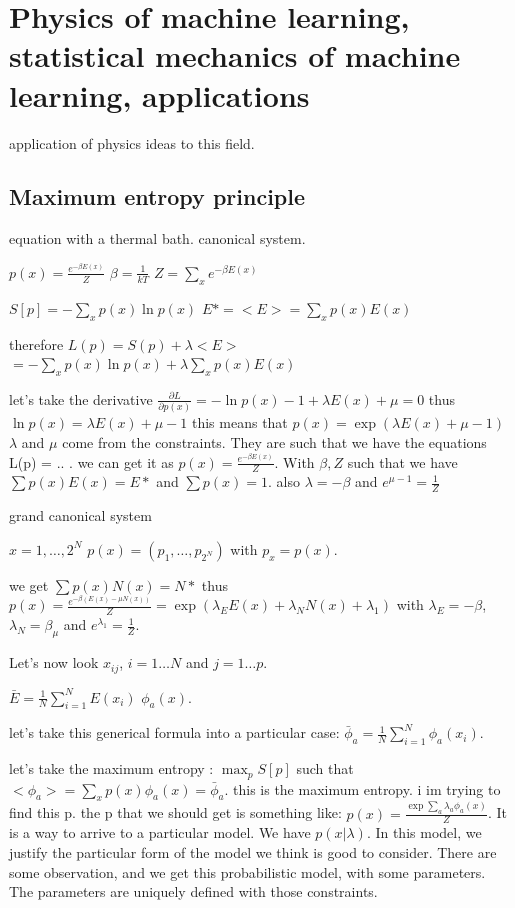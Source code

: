 \documentclass[a4paper]{tufte-book}
\newcommand{\nth}{\frac{1}{N}}
\newcommand{\sumin}{\sum_{i=1}^N}
\begin{document}
\chapter{Physics of machine learning, statistical mechanics of machine learning, applications}
\label{ch:physics}

application of physics ideas to this field.

\section{Maximum entropy principle}

equation with a thermal bath.
canonical system.


$p(x) = \frac{e^{-\beta E(x)}}{Z}$ $\beta = \frac{1}{kT}$
$Z = \sum_x e^{-\beta E(x)}$

$S[p] = - \sum_x p(x) \ln p(x)$
$E* = <E> = \sum_x p(x) E(x)$

therefore $L(p) = S(p) + \lambda <E>$
$ = - \sum_x p(x) \ln p(x) + \lambda \sum_x p(x) E(x)$

let's take the derivative
$\frac{\partial L}{\partial p(x)} = -\ln p(x) - 1 + \lambda E(x) + \mu = 0$
thus $\ln p(x) = \lambda E(x) + \mu - 1$
this means that $p(x) = \exp (\lambda E(x) + \mu - 1)$
$\lambda$ and $\mu$ come from the constraints. They are such that we have the equations L(p) = .. . 
we can get it as
$p(x) = \frac{e^{-\beta E(x)}}{Z}$. With $\beta,Z$ such that we have 
$\sum p(x) E(x) = E*$ and $ \sum p(x) = 1$.
also $\lambda = - \beta$ and $e^{\mu - 1} = \frac{1}{Z}$

grand canonical system

$x = 1, \ldots, 2^N$
$p(x) = (p_1,\ldots, p_{2^N})$
with $p_x = p(x)$.

we get
$\sum p(x) N(x) = N*$
thus $p(x) = \frac{e^{-\beta (E(x) - \mu N(x))}}{Z} = \exp (\lambda_E E(x) + \lambda_N N(x) + \lambda_1)$
with $\lambda_E = - \beta$, $\lambda_N = \beta_\mu$ and $e^{\lambda_1} = \frac{1}{Z}$.

Let's now look $x_{ij}$, $i = 1\ldots N$ and $j=1\ldots p$.

$\bar E = \nth \sumin E(x_i)$
$\phi_a(x)$.

let's take this generical formula into a particular case:
$\bar \phi_a = \nth \sumin \phi_a(x_i)$.

let's take the maximum entropy : $\max_p S[p]$ such that
$<\phi_a> = \sum_x p(x) \phi_a(x) = \bar \phi_a$.
this is the maximum entropy. i im trying to find this p.
the p that we should get is something like:
$p(x) = \frac{\exp \sum_a \lambda_a \phi_a(x)}{Z}$. It is a way to arrive to a
particular model. We have $p(x|\lambda)$. In this model, we justify the
particular form of the model we think is good to consider. There are some observation, and we get this probabilistic model, with some parameters. The
parameters are uniquely defined with those constraints.
\end{document}
